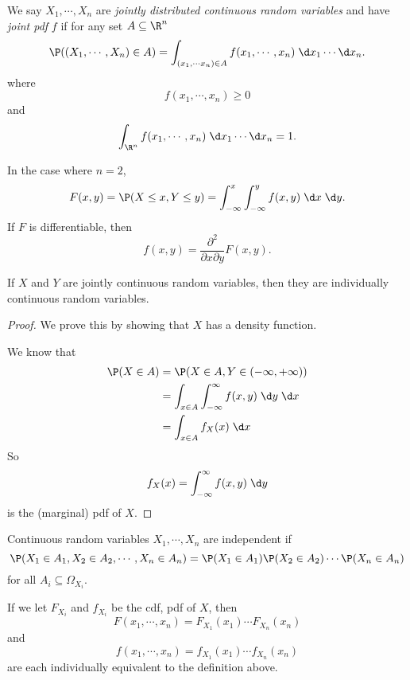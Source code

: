 \documentclass[a4paper]{article}
\begin{document}
\begin{defi}
  We say $X_1, \cdots, X_n$ are \emph{jointly distributed continuous random variables} and have \emph{joint pdf} $f$ if for any set $A\subseteq \R^n$
  \[
    \P((X_1, \cdots, X_n)\in A) = \int_{(x_1, \cdots x_n)\in A} f(x_1, \cdots, x_n)\;\d x_1\cdots \d x_n.
  \]
  where
  \[
    f(x_1, \cdots, x_n) \geq 0
  \]
  and
  \[
    \int_{\R^n} f(x_1, \cdots, x_n)\;\d x_1 \cdots \d x_n = 1.
  \]
\end{defi}

\begin{eg}
  In the case where $n = 2$,
  \[
    F(x, y) = \P(X \leq x,Y \leq y) = \int_{-\infty}^x\int_{-\infty}^y f(x, y)\;\d x\;\d y.
  \]
  If $F$ is differentiable, then
  \[
    f(x, y) = \frac{\partial^2}{\partial x\partial y}F(x, y).
  \]
\end{eg}

\begin{thm}
  If $X$ and $Y$ are jointly continuous random variables, then they are individually continuous random variables.
\end{thm}

\begin{proof}
  We prove this by showing that $X$ has a density function.

  We know that
  \begin{align*}
    \P(X \in A) &= \P(X \in A, Y\in (-\infty, +\infty))\\
    &= \int_{x\in A}\int_{-\infty}^\infty f(x, y)\;\d y\;\d x\\
    &= \int_{x\in A} f_X(x)\;\d x
  \end{align*}
  So
  \[
    f_X(x) = \int_{-\infty}^\infty f(x, y)\;\d y
  \]
  is the (marginal) pdf of $X$.
\end{proof}

\begin{defi}
  Continuous random variables $X_1, \cdots, X_n$ are independent if
  \[
    \P(X_1\in A_1, X_2 \in A_2, \cdots, X_n\in A_n) = \P(X_1 \in A_1)\P(X_2 \in A_2) \cdots \P(X_n \in A_n)
  \]
  for all $A_i\subseteq \Omega_{X_i}$.

  If we let $F_{X_i}$ and $f_{X_i}$ be the cdf, pdf of $X$, then
  \[
    F(x_1, \cdots, x_n) = F_{X_1}(x_1)\cdots F_{X_n}(x_n)
  \]
  and
  \[
    f(x_1, \cdots, x_n) = f_{X_1}(x_1) \cdots f_{X_n}(x_n)
  \]
  are each individually equivalent to the definition above.
\end{defi}
\end{document}
